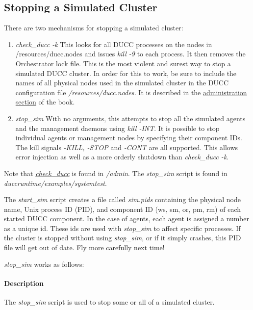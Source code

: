     \subsection{Stopping a Simulated Cluster}

    There are two mechanisms for stopping a simulated cluster:
    \begin{enumerate}
      \item {\em check\_ducc -k} This looks for all DUCC processes on the nodes in
        \ducchome/resources/ducc.nodes and issues {\em kill -9} to each process.  It
        then removes the Orchestrator lock file.  This is the most violent and
        surest way to stop a simulated DUCC cluster.  In order for this to work,
        be sure to include the names of all physical nodes used in the simulated cluster
        in the DUCC configuration file {\em \duccruntime/resources/ducc.nodes.}  It
        is described in the \hyperref[subsec:admin.check-ducc]{administration section} of the book.

      \item {\em stop\_sim} With no arguments, this attempts to stop all the simulated
        agents and the management daemons using {\em kill -INT}.  It is possible to
        stop individual agents or management nodes by specifying their component IDs.
        The kill signals {\em -KILL, -STOP} and {\em -CONT} are all supported.  This
        allows error injection as well as a more orderly shutdown than 
        {\em check\_ducc -k}.
    \end{enumerate}

      Note that \hyperref[subsec:admin.check-ducc]{{\em check\_ducc}} is found in 
      {\em \duccruntime/admin}.  The {\em stop\_sim} script is found in {\em
        duccruntime/examples/systemtest}.  
  
    The {\em start\_sim} script creates a file called {\em sim.pids} containing the
    physical node name, Unix process ID (PID), and component ID (ws, sm, or, pm, rm) of
    each started DUCC component.  In the case of agents, each agent is assigned a
    number as a unique id.  These ids are used with {\em stop\_sim} to affect
    specific processes.  If the cluster is stopped without using {\em stop\_sim}, or
    if it simply crashes, this PID file will get out of date.  Fly more carefully
    next time!

    {\em stop\_sim} works as follows:
    \paragraph{Description}
    The {\em stop\_sim} script is used to stop some or all of a simulated cluster.
    
